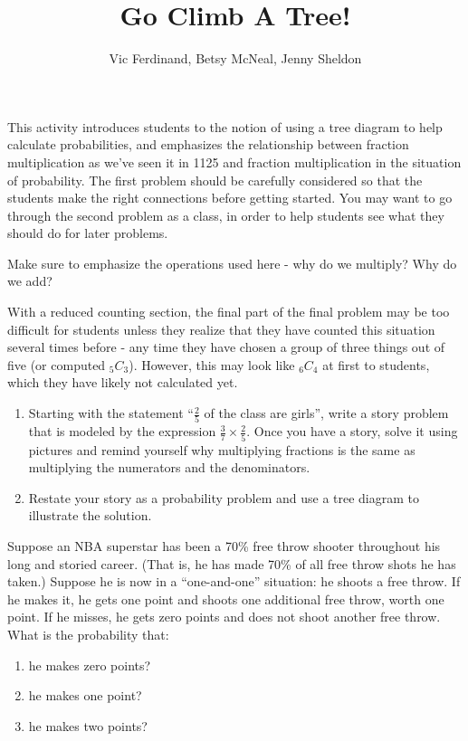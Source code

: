 \documentclass{ximera}
\title{Go Climb A Tree!}
\author{Vic Ferdinand, Betsy McNeal, Jenny Sheldon}
\begin{document}
\begin{abstract}
\end{abstract}
\maketitle

\begin{instructorIntro}
This activity introduces students to the notion of using a tree diagram to help calculate probabilities, and emphasizes the relationship between fraction multiplication as we've seen it in 1125 and fraction multiplication in the situation of probability.  The first problem should be carefully considered so that the students make the right connections before getting started.  You may want to go through the second problem as a class, in order to help students see what they should do for later problems.

Make sure to emphasize the operations used here - why do we multiply?  Why do we add?

With a reduced counting section, the final part of the final problem may be too difficult for students unless they realize that they have counted this situation several times before - any time they have chosen a group of three things out of five (or computed $_5C_3$).  However, this may look like $_6C_4$ at first to students, which they have likely not calculated yet.
\end{instructorIntro}

\begin{problem}
\begin{enumerate}
\item Starting with the statement ``$\frac25$ of the class are girls'', write a story problem that is modeled by the expression $\frac37 \times \frac25$.  Once you have a story, solve it using pictures and remind yourself why multiplying fractions is the same as multiplying the numerators and the denominators.
\item Restate your story as a probability problem and use a tree diagram to illustrate the solution.
\end{enumerate}
\end{problem}

\begin{problem}\label{NBAStar}
Suppose an NBA superstar has been a 70\% free throw shooter throughout his long and storied career.  (That is, he has made 70\% of all free throw shots he has taken.)  Suppose he is now in a ``one-and-one'' situation: he shoots a free throw.  If he makes it, he gets one point and shoots one additional free throw, worth one point.  If he misses, he gets zero points and does not shoot another free throw.  What is the probability that:
\begin{enumerate}
\item he makes zero points?
\item he makes one point?
\item he makes two points?
\end{enumerate}
\end{problem}
\end{document}
